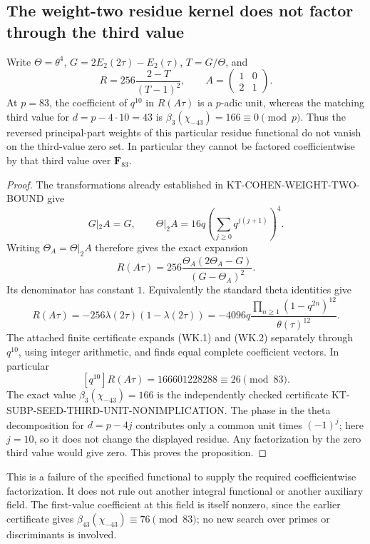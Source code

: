 \subsection{The weight-two residue kernel does not factor through the third value}

\begin{proposition}
Write $\Theta=\theta^4$, $G=2E_2(2\tau)-E_2(\tau)$,
$T=G/\Theta$, and
\[
 R=256\frac{2-T}{(T-1)^2},\qquad
 A=\begin{pmatrix}1&0\\2&1\end{pmatrix}.
\]
At $p=83$, the coefficient of $q^{10}$ in $R(A\tau)$ is a
$p$-adic unit, whereas the matching third value for
$d=p-4\cdot10=43$ is $\beta_3(\chi_{-43})=166\equiv0\pmod p$.
Thus the reversed principal-part weights of this particular residue
functional do not vanish on the third-value zero set.  In particular
they cannot be factored coefficientwise by that third value over
$\mathbf F_{83}$.
\end{proposition}

\begin{proof}
The transformations already established in
KT-COHEN-WEIGHT-TWO-BOUND give
\[
 G|_2A=G,\qquad
 \Theta|_2A=16q\left(\sum_{j\geq0}q^{j(j+1)}\right)^4.
\]
Writing $\Theta_A=\Theta|_2A$ therefore gives the exact expansion
\[
 R(A\tau)=256\frac{\Theta_A(2\Theta_A-G)}{(G-\Theta_A)^2}.
 \tag{WK.1}
\]
Its denominator has constant $1$.  Equivalently the standard theta
identities give
\[
 R(A\tau)=-256\lambda(2\tau)(1-\lambda(2\tau))
   =-4096q\frac{\prod_{n\geq1}(1-q^{2n})^{12}}{\theta(\tau)^{12}}.
 \tag{WK.2}
\]
The attached finite certificate expands (WK.1) and (WK.2) separately
through $q^{10}$, using integer arithmetic, and finds equal complete
coefficient vectors.  In particular
\[
 [q^{10}]R(A\tau)=166601228288\equiv26\pmod{83}.
\]
The exact value $\beta_3(\chi_{-43})=166$ is the independently checked
certificate KT-SUBP-SEED-THIRD-UNIT-NONIMPLICATION.  The phase in the
theta decomposition for $d=p-4j$ contributes only a common unit times
$(-1)^j$; here $j=10$, so it does not change the displayed residue.
Any factorization by the zero third value would give zero.  This
proves the proposition.
\end{proof}

This is a failure of the specified functional to supply the required
coefficientwise factorization.  It does not rule out another integral
functional or another auxiliary field.  The first-value coefficient at
this field is itself nonzero, since the earlier certificate gives
$\beta_{43}(\chi_{-43})\equiv76\pmod{83}$; no new search over primes or
discriminants is involved.
